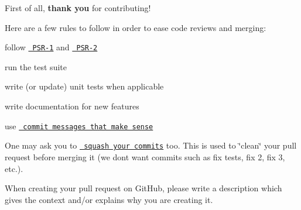 First of all, {\bfseries{thank you}} for contributing!

Here are a few rules to follow in order to ease code reviews and merging\+:


\begin{DoxyItemize}
\item follow \href{http://www.php-fig.org/psr/1/}{\texttt{ PSR-\/1}} and \href{http://www.php-fig.org/psr/2/}{\texttt{ PSR-\/2}}
\item run the test suite
\item write (or update) unit tests when applicable
\item write documentation for new features
\item use \href{http://tbaggery.com/2008/04/19/a-note-about-git-commit-messages.html}{\texttt{ commit messages that make sense}}
\end{DoxyItemize}

One may ask you to \href{http://gitready.com/advanced/2009/02/10/squashing-commits-with-rebase.html}{\texttt{ squash your commits}} too. This is used to \char`\"{}clean\char`\"{} your pull request before merging it (we don\textquotesingle{}t want commits such as {\ttfamily fix tests}, {\ttfamily fix 2}, {\ttfamily fix 3}, etc.).

When creating your pull request on Git\+Hub, please write a description which gives the context and/or explains why you are creating it. 
